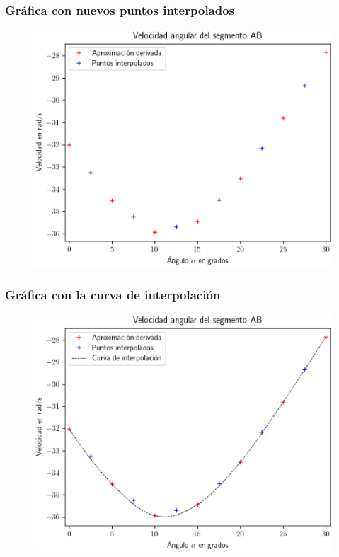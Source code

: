\documentclass[12pt]{beamer}
\begin{document}
\begin{frame}
\frametitle{Gráfica con nuevos puntos interpolados}
\begin{figure}
    \centering
    \includegraphics[scale=0.55]{Imagenes/diferenciacion_ejercicio_segmento_02.eps}
\end{figure}
\end{frame}
\begin{frame}
\frametitle{Gráfica con la curva de interpolación}
\begin{figure}
    \centering
    \includegraphics[scale=0.55]{Imagenes/diferenciacion_ejercicio_segmento_03.eps}
\end{figure}
\end{frame}
\end{document}
